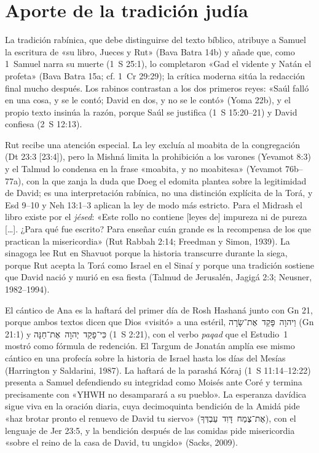 \documentclass[11pt,letterpaper]{article}
\newcommand{\heb}[1]{\mbox{\foreignlanguage{hebrew}{#1}}}
\begin{document}
\section{Aporte de la tradición judía}

La tradición rabínica, que debe distinguirse del texto bíblico, atribuye a Samuel la escritura de «su libro, Jueces y Rut» (Bava Batra 14b) y añade que, como 1~Samuel narra su muerte (1~S 25:1), lo completaron «Gad el vidente y Natán el profeta» (Bava Batra 15a; cf. 1~Cr 29:29); la crítica moderna sitúa la redacción final mucho después. Los rabinos contrastan a los dos primeros reyes: «Saúl falló en una cosa, y se le contó; David en dos, y no se le contó» (Yoma 22b), y el propio texto insinúa la razón, porque Saúl se justifica (1~S 15:20--21) y David confiesa (2~S 12:13).

Rut recibe una atención especial. La ley excluía al moabita de la congregación (Dt 23:3 [23:4]), pero la Mishná limita la prohibición a los varones (Yevamot 8:3) y el Talmud lo condensa en la frase «moabita, y no moabitesa» (Yevamot 76b--77a), con la que zanja la duda que Doeg el edomita plantea sobre la legitimidad de David; es una interpretación rabínica, no una distinción explícita de la Torá, y Esd 9--10 y Neh 13:1--3 aplican la ley de modo más estricto. Para el Midrash el libro existe por el \emph{jésed}: «Este rollo no contiene [leyes de] impureza ni de pureza [\ldots]. ¿Para qué fue escrito? Para enseñar cuán grande es la recompensa de los que practican la misericordia» (Rut Rabbah 2:14; Freedman y Simon, 1939). La sinagoga lee Rut en Shavuot porque la historia transcurre durante la siega, porque Rut acepta la Torá como Israel en el Sinaí y porque una tradición sostiene que David nació y murió en esa fiesta (Talmud de Jerusalén, Jagigá 2:3; Neusner, 1982--1994).

El cántico de Ana es la haftará del primer día de Rosh Hashaná junto con Gn 21, porque ambos textos dicen que Dios «visitó» a una estéril, \heb{וַיהוָה פָּקַד אֶת־שָׂרָה} (Gn 21:1) y \heb{כִּי־פָקַד יְהוָה אֶת־חַנָּה} (1~S 2:21), con el verbo \emph{paqad} que el Estudio~1 mostró como fórmula de redención. El Targum de Jonatán amplía ese mismo cántico en una profecía sobre la historia de Israel hasta los días del Mesías (Harrington y Saldarini, 1987). La haftará de la parashá Kóraj (1~S 11:14--12:22) presenta a Samuel defendiendo su integridad como Moisés ante Coré y termina precisamente con «YHWH no desamparará a su pueblo». La esperanza davídica sigue viva en la oración diaria, cuya decimoquinta bendición de la Amidá pide «haz brotar pronto el renuevo de David tu siervo» (\heb{אֶת־צֶמַח דָּוִד עַבְדְּךָ}), con el lenguaje de Jer 23:5, y la bendición después de las comidas pide misericordia «sobre el reino de la casa de David, tu ungido» (Sacks, 2009).
\end{document}
